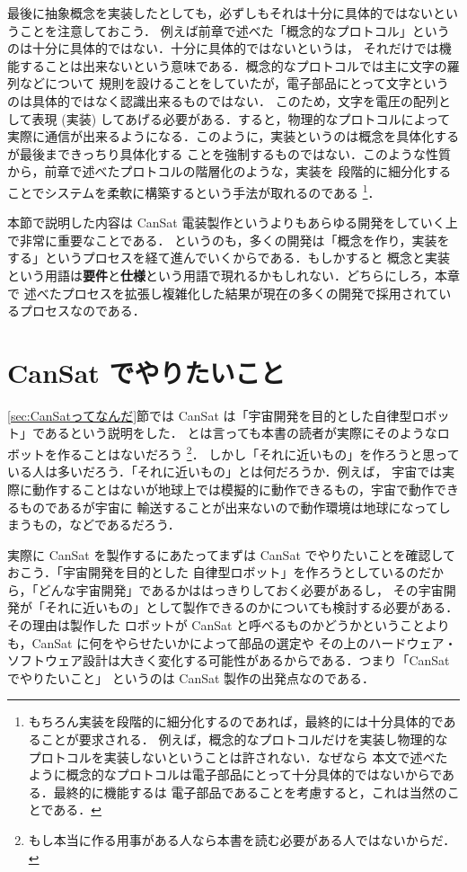 \documentclass[dvipdfmx]{jsbook}
\begin{document}
  最後に抽象概念を実装したとしても，必ずしもそれは十分に具体的ではないということを注意しておこう．
  例えば前章で述べた「概念的なプロトコル」というのは十分に具体的ではない．十分に具体的ではないというは，
  それだけでは機能することは出来ないという意味である．概念的なプロトコルでは主に文字の羅列などについて
  規則を設けることをしていたが，電子部品にとって文字というのは具体的ではなく認識出来るものではない．
  このため，文字を電圧の配列として表現 (実装) してあげる必要がある．すると，物理的なプロトコルによって
  実際に通信が出来るようになる．このように，実装というのは概念を具体化するが最後まできっちり具体化する
  ことを強制するものではない．このような性質から，前章で述べたプロトコルの階層化のような，実装を
  段階的に細分化することでシステムを柔軟に構築するという手法が取れるのである
  \footnote{もちろん実装を段階的に細分化するのであれば，最終的には十分具体的であることが要求される．
  例えば，概念的なプロトコルだけを実装し物理的なプロトコルを実装しないということは許されない．なぜなら
  本文で述べたように概念的なプロトコルは電子部品にとって十分具体的ではないからである．最終的に機能するは
  電子部品であることを考慮すると，これは当然のことである．}．

  本節で説明した内容は CanSat 電装製作というよりもあらゆる開発をしていく上で非常に重要なことである．
  というのも，多くの開発は「概念を作り，実装をする」というプロセスを経て進んでいくからである．もしかすると
  概念と実装という用語は{\bf 要件}と{\bf 仕様}という用語で現れるかもしれない．どちらにしろ，本章で
  述べたプロセスを拡張し複雑化した結果が現在の多くの開発で採用されているプロセスなのである．

\section{CanSat でやりたいこと}

  \ref{sec:CanSatってなんだ}節では CanSat は「宇宙開発を目的とした自律型ロボット」であるという説明をした．
  とは言っても本書の読者が実際にそのようなロボットを作ることはないだろう
  \footnote{もし本当に作る用事がある人なら本書を読む必要がある人ではないからだ．}．
  しかし「それに近いもの」を作ろうと思っている人は多いだろう．「それに近いもの」とは何だろうか．例えば，
  宇宙では実際に動作することはないが地球上では模擬的に動作できるもの，宇宙で動作できるものであるが宇宙に
  輸送することが出来ないので動作環境は地球になってしまうもの，などであるだろう．
  
  実際に CanSat を製作するにあたってまずは CanSat でやりたいことを確認しておこう．「宇宙開発を目的とした
  自律型ロボット」を作ろうとしているのだから，「どんな宇宙開発」であるかははっきりしておく必要があるし，
  その宇宙開発が「それに近いもの」として製作できるのかについても検討する必要がある．その理由は製作した
  ロボットが CanSat と呼べるものかどうかということよりも，CanSat に何をやらせたいかによって部品の選定や
  その上のハードウェア・ソフトウェア設計は大きく変化する可能性があるからである．つまり「CanSat でやりたいこと」
  というのは CanSat 製作の出発点なのである．
\end{document}
